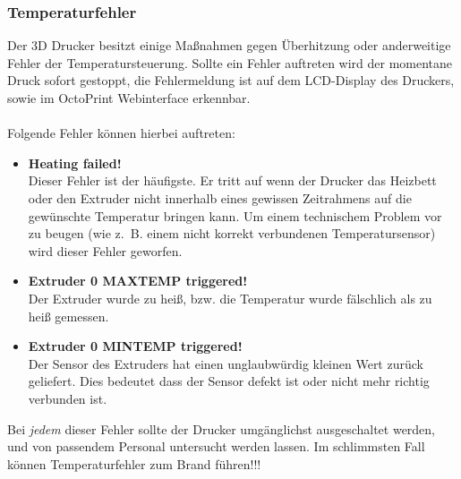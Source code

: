 \subsubsection{Temperaturfehler}

Der 3D Drucker besitzt einige Maßnahmen gegen Überhitzung oder anderweitige Fehler der Temperatursteuerung. Sollte ein Fehler auftreten wird der momentane Druck sofort gestoppt, die Fehlermeldung ist auf dem LCD-Display des Druckers, sowie im OctoPrint Webinterface erkennbar.\\ \\
Folgende Fehler können hierbei auftreten:

\begin{itemize}
\item \textbf{Heating failed!} \\
		Dieser Fehler ist der häufigste. Er tritt auf wenn der Drucker das Heizbett oder den Extruder nicht innerhalb eines gewissen Zeitrahmens auf die gewünschte Temperatur bringen kann. Um einem technischem Problem vor zu beugen (wie z.~B. einem nicht korrekt verbundenen Temperatursensor) wird dieser Fehler geworfen.
\item \textbf{Extruder 0 MAXTEMP triggered!} \\ 
		Der Extruder wurde zu heiß, bzw. die Temperatur wurde fälschlich als zu heiß gemessen.
\item \textbf{Extruder 0 MINTEMP triggered!} \\
		Der Sensor des Extruders hat einen unglaubwürdig kleinen Wert zurück geliefert. Dies bedeutet dass der Sensor defekt ist oder nicht mehr richtig verbunden ist.
\end{itemize}

Bei \emph{jedem} dieser Fehler sollte der Drucker umgänglichst ausgeschaltet werden, und von passendem Personal untersucht werden lassen.
Im schlimmsten Fall können Temperaturfehler zum Brand führen!!!
